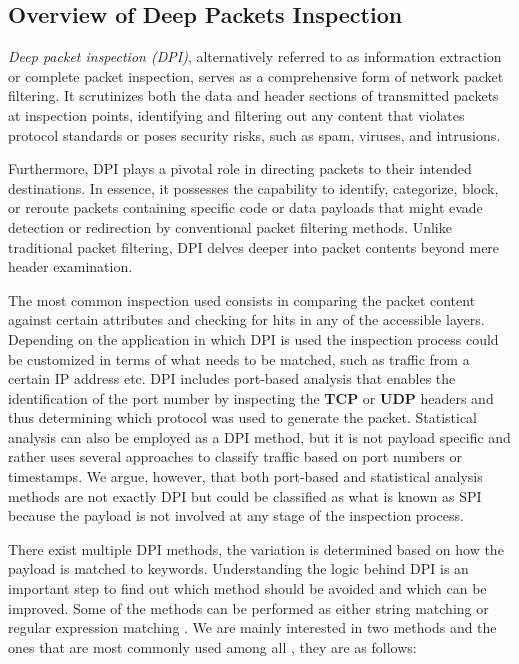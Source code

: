\documentclass[12pt,letterpaper]{article}
\begin{document}
        \subsection{Overview of Deep Packets Inspection}

        \textit{Deep packet inspection (DPI)}, alternatively referred to as information extraction or complete packet inspection, serves as a comprehensive form of network packet filtering. It scrutinizes both the data and header sections of transmitted packets at inspection points, identifying and filtering out any content that violates protocol standards or poses security risks, such as spam, viruses, and intrusions.
        
        Furthermore, DPI plays a pivotal role in directing packets to their intended destinations. In essence, it possesses the capability to identify, categorize, block, or reroute packets containing specific code or data payloads that might evade detection or redirection by conventional packet filtering methods. Unlike traditional packet filtering, DPI delves deeper into packet contents beyond mere header examination.

        The most common inspection used consists in comparing the packet content against certain attributes and checking for hits in any of the accessible layers. Depending on the application in which DPI is used the inspection process could be customized in terms of what needs to be matched, such as traffic from a certain IP address etc. DPI includes port-based analysis that enables the identification of the port number by inspecting the \textbf{TCP} or \textbf{UDP} headers and thus determining which protocol was used to generate the packet. Statistical analysis can also be employed as a DPI method, but it is not payload specific and rather uses several approaches to classify traffic based on port numbers or timestamps. We argue, however, that both port-based and statistical analysis methods are not exactly DPI but could be classified as what is known as \ac{SPI} \textcite{mochalski2009} because the payload is not involved at any stage of the inspection process. 

        There exist multiple DPI methods, the variation is determined based on how the payload is matched to keywords. Understanding the logic behind DPI is an important step to find out which method should be avoided and which can be improved. Some of the methods can be performed as either string matching or regular expression matching \textcite{Xu2016ASO}. We are mainly interested in two methods and the ones that are most commonly used among all \textcite{Xu2016ASO}, they are as follows:
\end{document}

